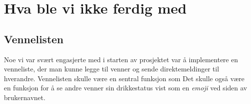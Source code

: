 \section{Hva ble vi ikke ferdig med}
\subsection{Vennelisten}
Noe vi var svært engasjerte med i starten av prosjektet var å implementere en venneliste, der man kunne legge til venner og sende direktemeldinger til hverandre. Vennelisten skulle være en sentral funksjon som  Det skulle også være en funksjon for å se andre venner sin drikkestatus vist som en \textit{emoji} ved siden av brukernavnet.

